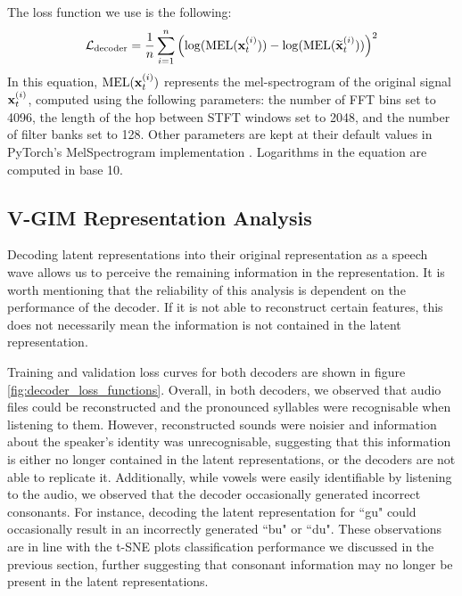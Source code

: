 		The loss function we use is the following:
		$$
		\mathcal{L}_{\text{decoder}} =\frac{1}{n} \sum_{i=1}^n\left( \log (\text{MEL} (\mathbf{x}_t^{(i)})) -\log (\text{MEL} (\widetilde{\mathbf{x}}_t^{(i)} )) \right)^2
		$$
		In this equation, $\text{MEL} (\mathbf{x}_t^{(i)})$ represents the mel-spectrogram of the original signal $\mathbf{x}_t^{(i)}$, computed using the following parameters: the number of FFT bins set to 4096, the length of the hop between STFT windows set to 2048, and the number of filter banks set to 128. Other parameters are kept at their default values in PyTorch's MelSpectrogram implementation \citep{paszkeAutomaticDifferentiationPyTorch2017}. Logarithms in the equation are computed in base 10.
		
		
		
		

			
	\subsection{V-GIM Representation Analysis}
		Decoding latent representations into their original representation as a speech wave allows us to perceive the remaining information in the representation. It is worth mentioning that the reliability of this analysis is dependent on the performance of the decoder. If it is not able to reconstruct certain features, this does not necessarily mean the information is not contained in the latent representation. 
		
		Training and validation loss curves for both decoders are shown in figure \ref{fig:decoder_loss_functions}. Overall, in both decoders, we observed that audio files could be reconstructed and the pronounced syllables were recognisable when listening to them. However, reconstructed sounds were noisier and information about the speaker's identity was unrecognisable, suggesting that this information is either no longer contained in the latent representations, or the decoders are not able to replicate it. Additionally, while vowels were easily identifiable by listening to the audio, we observed that the decoder occasionally generated incorrect consonants. For instance, decoding the latent representation for ``gu" could occasionally result in an incorrectly generated ``bu" or ``du". These observations are in line with the t-SNE plots classification performance we discussed in the previous section, further suggesting that consonant information may no longer be present in the latent representations.
		
